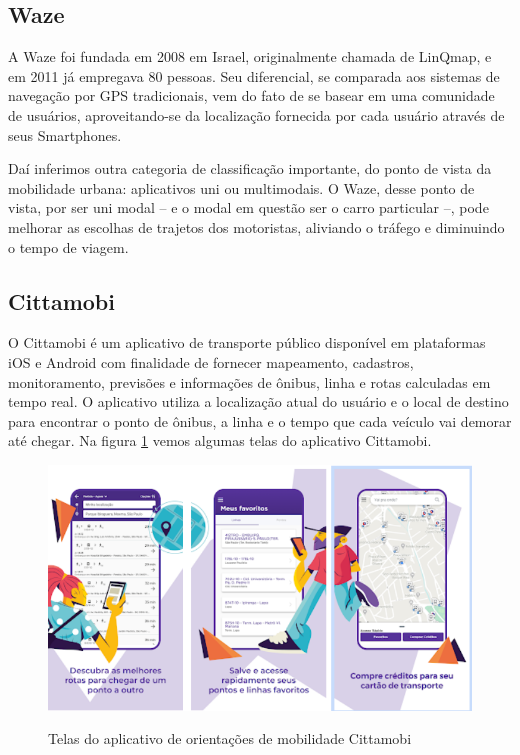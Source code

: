 
\subsection{Waze}

A Waze foi fundada em 2008 em Israel, originalmente chamada de LinQmap, e em 2011 já
empregava 80 pessoas. Seu diferencial, se comparada aos sistemas de navegação por GPS tradicionais, vem do fato de se basear em uma comunidade de usuários, aproveitando-se da localização fornecida por cada usuário através de seus Smartphones. 

Daí inferimos outra categoria de classificação importante, do ponto de vista da mobilidade
urbana: aplicativos uni ou multimodais. O Waze, desse ponto de vista, por ser uni modal – e o modal em questão ser o carro particular –, pode melhorar as escolhas de trajetos dos motoristas, aliviando o tráfego e diminuindo o tempo de viagem.


\subsection{Cittamobi}
O Cittamobi é um aplicativo de transporte público disponível em plataformas iOS e Android com finalidade de fornecer mapeamento, cadastros, monitoramento, previsões e informações de ônibus, linha e rotas calculadas em tempo real. O aplicativo utiliza a localização atual do usuário e o local de destino para encontrar o ponto de ônibus, a linha e o tempo que cada veículo vai demorar até chegar. Na figura \ref{fig:cittamobi} vemos algumas telas do aplicativo Cittamobi.

\begin{figure}[!hbtp]
	\centering
	\caption{Telas do aplicativo de orientações de mobilidade Cittamobi}
	\includegraphics[width=0.4	\textwidth]{./04-figuras/cittamobi/cittamobi.png}
	\label{fig:cittamobi}
\end{figure}



